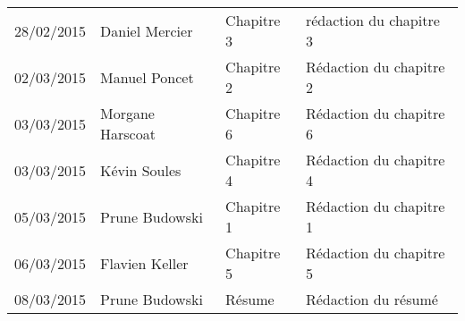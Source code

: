\small
\begin{tabular}{|p{1.5cm}| >{\raggedright}p{2.5cm}|p{2.5cm}|p{8.5cm}|}
  \hline
  \rowcolor{Gainsboro} \color{Navy}{\bfseries Date}  & \color{Navy}{\bfseries Auteur} & \color{Navy}{\bfseries Section(s)}  &\color{Navy}{\bfseries Commentaires} \\
  \hline
  28/02/2015 & Daniel Mercier & Chapitre 3 & rédaction du chapitre 3\\
  \hline
  02/03/2015 & Manuel Poncet & Chapitre 2 & Rédaction du chapitre 2\\
  \hline
  03/03/2015 & Morgane Harscoat & Chapitre 6 & Rédaction du chapitre 6\\
  \hline
  03/03/2015 & Kévin Soules & Chapitre 4 & Rédaction du chapitre 4\\
  \hline
  05/03/2015 & Prune Budowski & Chapitre 1 & Rédaction du chapitre 1\\
  \hline
  06/03/2015 & Flavien Keller & Chapitre 5 & Rédaction du chapitre 5\\
  \hline
  08/03/2015 & Prune Budowski & Résume & Rédaction du résumé\\
  \hline
\end{tabular}
\normalsize
